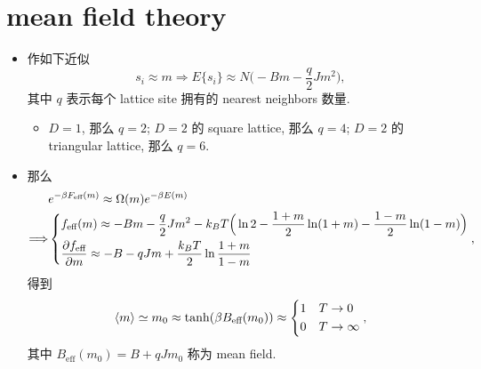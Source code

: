 \section{mean field theory}
\begin{itemize}
	\item 作如下近似
	\begin{equation}
		s_i \approx m \Longrightarrow E\{s_i\} \approx N \Big( - B m - \frac{q}{2} J m^2 \Big),
	\end{equation}
	其中 $q$ 表示每个 lattice site 拥有的 nearest neighbors 数量.
	\begin{itemize}
		\item $D = 1$, 那么 $q = 2$; $D = 2$ 的 square lattice, 那么 $q = 4$; $D = 2$ 的 triangular lattice, 那么 $q = 6$.
	\end{itemize}
	
	\item 那么
	\begin{align}
		& e^{- \beta F_\text{eff}(m)} \approx \Omega(m) e^{- \beta E(m)} \notag \\
		\Longrightarrow & \begin{dcases}
			f_\text{eff}(m) \approx - B m - \frac{q}{2} J m^2 - k_B T \Big( \ln 2 - \frac{1 + m}{2} \ln(1 + m) - \frac{1 - m}{2} \ln(1 - m) \Big) \\
			\frac{\partial f_\text{eff}}{\partial m} \approx - B - q J m + \frac{k_B T}{2} \ln \frac{1 + m}{1 - m}
		\end{dcases},
	\end{align}
	得到
	\begin{equation}
		\braket{m} \simeq m_0 \approx \tanh(\beta B_\text{eff}(m_0)) \approx \begin{dcases}
			1 & T \rightarrow 0 \\
			0 & T \rightarrow \infty
		\end{dcases},
	\end{equation}
	其中 $B_\text{eff}(m_0) = B + q J m_0$ 称为 mean field.
\end{itemize}
